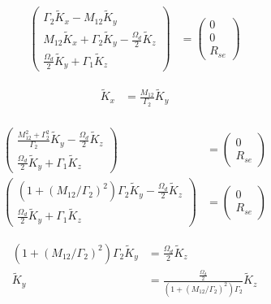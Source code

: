 \documentclass{article}
\begin{document}
\begin{align}
    \left(\begin{array}{c}
        \Gamma_2\tilde{K}_{x} - M_{12}\tilde{K}_{y}\\
        M_{12}\tilde{K}_{x}+\Gamma_2\tilde{K}_{y}-\frac{\Omega_d}{2}\tilde{K}_{z}\\
        \frac{\Omega_d}{2}\tilde{K}_{y}+\Gamma_1\tilde{K}_{z}
    \end{array}\right)&=
    \left(\begin{array}{c}
        0\\
        0\\
        R_{se} 
    \end{array}\right)
\end{align}

\begin{align}
    \tilde{K}_{x} &= \frac{M_{12}}{\Gamma_2}\tilde{K}_{y}\\
\end{align}

\begin{align}
    \left(\begin{array}{c}
        \frac{M_{12}^2+\Gamma_2^2}{\Gamma_2}\tilde{K}_{y}-\frac{\Omega_d}{2}\tilde{K}_{z}\\
        \frac{\Omega_d}{2}\tilde{K}_{y}+\Gamma_1\tilde{K}_{z}
    \end{array}\right)&=
    \left(\begin{array}{c}
        0\\
        R_{se} 
    \end{array}\right)\\
    \left(\begin{array}{c}
        \left(1 + \left(M_{12}/\Gamma_2\right)^2\right)\Gamma_2\tilde{K}_{y}-\frac{\Omega_d}{2}\tilde{K}_{z}\\
        \frac{\Omega_d}{2}\tilde{K}_{y}+\Gamma_1\tilde{K}_{z}
    \end{array}\right)&=
    \left(\begin{array}{c}
        0\\
        R_{se} 
    \end{array}\right)
\end{align}


\begin{align}
   \left(1 + \left(M_{12}/\Gamma_2\right)^2\right)\Gamma_2 \tilde{K}_{y} &=  \frac{\Omega_d}{2}\tilde{K}_{z}\\
    \tilde{K}_{y} &=  \frac{\frac{\Omega_d}{2}}{\left(1 + \left(M_{12}/\Gamma_2\right)^2\right)\Gamma_2}\tilde{K}_{z}\\
\end{align}
\end{document}
